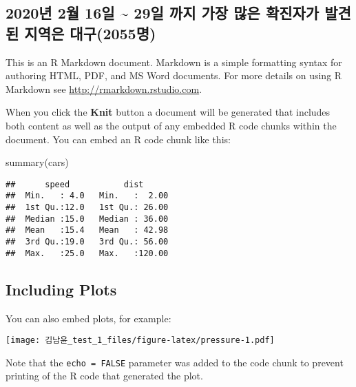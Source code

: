 \documentclass[
  12pt,
]{article}
\newenvironment{Shaded}{\begin{snugshade}}{\end{snugshade}}
\newcommand{\FunctionTok}[1]{\textcolor[rgb]{0.00,0.00,0.00}{#1}}
\newcommand{\NormalTok}[1]{#1}
\begin{document}
\hypertarget{uxb144-2uxc6d4-16uxc77c-29uxc77c-uxae4cuxc9c0-uxac00uxc7a5-uxb9ceuxc740-uxd655uxc9c4uxc790uxac00-uxbc1cuxacacuxb41c-uxc9c0uxc5eduxc740-uxb300uxad6c2055uxba85}{%
\subsection{2020년 2월 16일 \textasciitilde{} 29일 까지 가장 많은
확진자가 발견된 지역은
대구(2055명)}\label{uxb144-2uxc6d4-16uxc77c-29uxc77c-uxae4cuxc9c0-uxac00uxc7a5-uxb9ceuxc740-uxd655uxc9c4uxc790uxac00-uxbc1cuxacacuxb41c-uxc9c0uxc5eduxc740-uxb300uxad6c2055uxba85}}

This is an R Markdown document. Markdown is a simple formatting syntax
for authoring HTML, PDF, and MS Word documents. For more details on
using R Markdown see \url{http://rmarkdown.rstudio.com}.

When you click the \textbf{Knit} button a document will be generated
that includes both content as well as the output of any embedded R code
chunks within the document. You can embed an R code chunk like this:

\begin{Shaded}
\begin{Highlighting}[]
\FunctionTok{summary}\NormalTok{(cars)}
\end{Highlighting}
\end{Shaded}

\begin{verbatim}
##      speed           dist       
##  Min.   : 4.0   Min.   :  2.00  
##  1st Qu.:12.0   1st Qu.: 26.00  
##  Median :15.0   Median : 36.00  
##  Mean   :15.4   Mean   : 42.98  
##  3rd Qu.:19.0   3rd Qu.: 56.00  
##  Max.   :25.0   Max.   :120.00
\end{verbatim}

\hypertarget{including-plots}{%
\subsection{Including Plots}\label{including-plots}}

You can also embed plots, for example:

\texttt{[image: 김남윤\_test\_1\_files/figure-latex/pressure-1.pdf]}

Note that the \texttt{echo\ =\ FALSE} parameter was added to the code
chunk to prevent printing of the R code that generated the plot.
\end{document}
